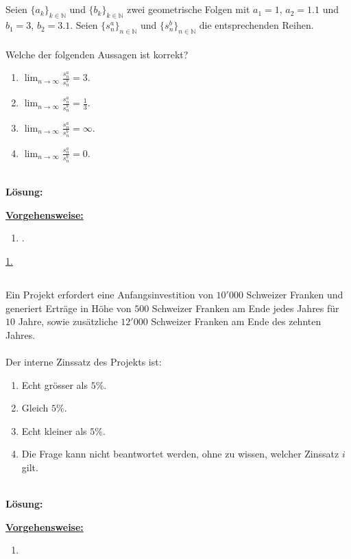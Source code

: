 \newpage

\subsection*{}
Seien $\{a_k\}_{k \in \mathbb{N}}$ und $\{b_k\}_{k \in \mathbb{N}}$ zwei geometrische Folgen mit $a_1 = 1$, $a_2= 1.1$ und $b_1 = 3$, $b_2 = 3.1$.
Seien $\{s_n^a \}_{n \in \mathbb{N}}$ und $\{s_n^b \}_{n \in \mathbb{N}}$ die entsprechenden Reihen.\\
\\
Welche der folgenden Aussagen ist korrekt? 
\renewcommand{\labelenumi}{(\alph{enumi})}
\begin{enumerate}
	\item 
	$\lim_{n \to \infty} \frac{s_n^a}{s_n^b} = 3$.
	\item
	$\lim_{n \to \infty} \frac{s_n^a}{s_n^b} = \frac{1}{3}$.
	\item
	$\lim_{n \to \infty} \frac{s_n^a}{s_n^b} = \infty$.
	\item
	$\lim_{n \to \infty} \frac{s_n^a}{s_n^b} = 0$.
\end{enumerate}
\ \\
\textbf{Lösung:}
\begin{mdframed}
\underline{\textbf{Vorgehensweise:}}
\renewcommand{\labelenumi}{\theenumi.}
\begin{enumerate}
\item .
\end{enumerate}
\end{mdframed}

\underline{1. }\\


\newpage
\subsection*{}
Ein Projekt erfordert eine Anfangsinvestition von $10'000$ Schweizer Franken und generiert Erträge in Höhe von $500$ Schweizer Franken am Ende jedes Jahres für $10$ Jahre, sowie zusätzliche $12'000$ Schweizer Franken am Ende des zehnten Jahres.\\
\\
Der interne Zinssatz des Projekts ist:
\renewcommand{\labelenumi}{(\alph{enumi})}
\begin{enumerate}
	\item 
	Echt grösser als $5 \%$.
	\item 
	Gleich $5 \%$.
	\item
	Echt kleiner als $5 \%$.
	\item
	Die Frage kann nicht beantwortet werden, ohne zu wissen, welcher Zinssatz $i$ gilt.
\end{enumerate}
\ \\
\textbf{Lösung:}
\begin{mdframed}
\underline{\textbf{Vorgehensweise:}}
\renewcommand{\labelenumi}{\theenumi.}
\begin{enumerate}
\item 
\end{enumerate}
\end{mdframed}

